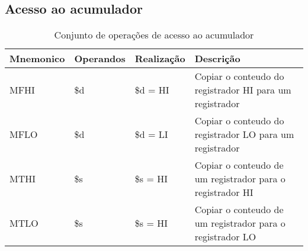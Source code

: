\documentclass{report}
\begin{document}
  \subsection{Acesso ao acumulador}
  \FloatBarrier
    \begin{table}[H]
      \begin{center}
        \begin{tabular}[pos]{|m{3cm}|m{2.8cm}|m{3cm}|m{4cm}|} 
          \hline
          \cellcolor[gray]{0.9}\textbf{Mnemonico} & \cellcolor[gray]{0.9}\textbf{Operandos} & \cellcolor[gray]{0.9}\textbf{Realização} & \cellcolor[gray]{0.9}\textbf{Descrição} \\ \hline
              MFHI  & \$d & \$d =  HI &  Copiar o conteudo do registrador HI para um registrador\\ \hline
              MFLO  & \$d & \$d = LI &  Copiar o conteudo do registrador LO para um registrador\\ \hline 
              MTHI  & \$s & \$s = HI &  Copiar o conteudo de um registrador para o registrador HI\\ \hline 
              MTLO  & \$s & \$s = HI &  Copiar o conteudo de um registrador para o registrador LO\\ \hline 
                           
        \end{tabular}
        \caption{Conjunto de operações de acesso ao acumulador}
		\label{table:conjOpAcu}
      \end{center}
    \end{table}
    
\end{document}
